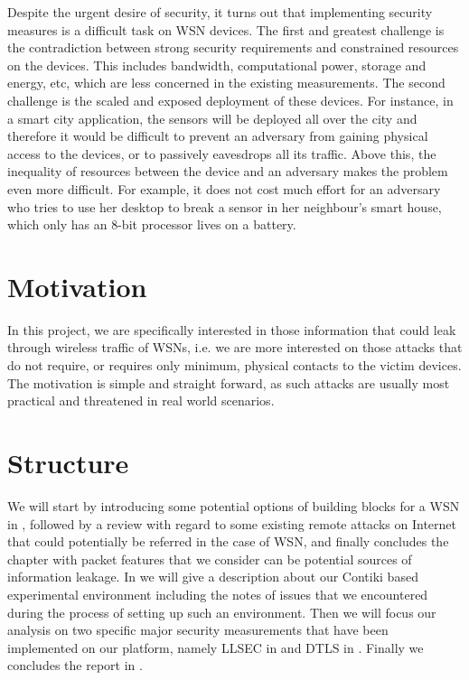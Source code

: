 Despite the urgent desire of security, it turns out that implementing security measures is a difficult task on WSN devices. The first and greatest challenge is the contradiction between strong security requirements and constrained resources on the devices. This includes bandwidth, computational power, storage and energy, etc, which are less concerned in the existing measurements. The second challenge is the scaled and exposed deployment of these devices. For instance, in a smart city application, the sensors will be deployed all over the city and therefore it would be difficult to prevent an adversary from gaining physical access to the devices, or to passively eavesdrops all its traffic. Above this, the inequality of resources between the device and an adversary makes the problem even more difficult. For example, it does not cost much effort for an adversary who tries to use her desktop to break a sensor in her neighbour’s smart house, which only has an 8-bit processor lives on a battery.

\section{Motivation}
In this project, we are specifically interested in those information that could leak through wireless traffic of WSNs, i.e. we are more interested on those attacks that do not require, or requires only minimum, physical contacts to the victim devices. The motivation is simple and straight forward, as such attacks are usually most practical and threatened in real world scenarios.

\section{Structure}
We will start by introducing some potential options of building blocks for a WSN in , followed by a review with regard to some existing remote attacks on Internet that could potentially be referred in the case of WSN, and finally concludes the chapter with packet features that we consider can be potential sources of information leakage. In  we will give a description about our Contiki\cite{Contiki} based experimental environment including the notes of issues that we encountered during the process of setting up such an environment. Then we will focus our analysis on two specific major security measurements that have been implemented on our platform, namely LLSEC in  and DTLS in . Finally we concludes the report in .